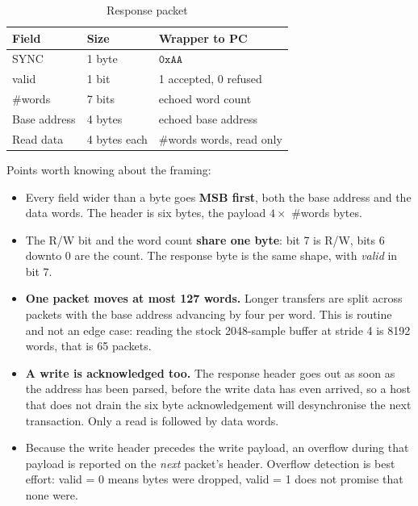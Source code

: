 \documentclass[twocolumn]{article}
\newcommand{\hex}[1]{\ensuremath{\mathtt{0x#1}}}
\begin{document}
\begin{table}[H]
    \centering
    \begin{tabular}{|l|l|l|}
        \hline
        \rowcolor{gray!40} \textbf{Field} & \textbf{Size} & \textbf{Wrapper to PC} \\
        \hline
        SYNC          & 1 byte  & \hex{AA} \\
        \hline
        valid         & 1 bit   & 1 accepted, 0 refused \\
        \hline
        \#words       & 7 bits  & echoed word count \\
        \hline
        Base address  & 4 bytes & echoed base address \\
        \hline
        Read data     & 4 bytes each & \#words words, read only \\
        \hline
    \end{tabular}
    \caption{Response packet}
    \label{tab:rsppkt}
\end{table}

Points worth knowing about the framing:

\begin{itemize}
    \item Every field wider than a byte goes \textbf{MSB first}, both the base address and the data words. The header is six bytes, the payload $4 \times$ \#words bytes.
    \item The R/W bit and the word count \textbf{share one byte}: bit 7 is R/W, bits 6 downto 0 are the count. The response byte is the same shape, with \emph{valid} in bit 7.
    \item \textbf{One packet moves at most 127 words.} Longer transfers are split across packets with the base address advancing by four per word. This is routine and not an edge case: reading the stock 2048-sample buffer at stride 4 is 8192 words, that is 65 packets.
    \item \textbf{A write is acknowledged too.} The response header goes out as soon as the address has been parsed, before the write data has even arrived, so a host that does not drain the six byte acknowledgement will desynchronise the next transaction. Only a read is followed by data words.
    \item Because the write header precedes the write payload, an overflow during that payload is reported on the \emph{next} packet's header. Overflow detection is best effort: valid = 0 means bytes were dropped, valid = 1 does not promise that none were.
\end{itemize}
\end{document}
